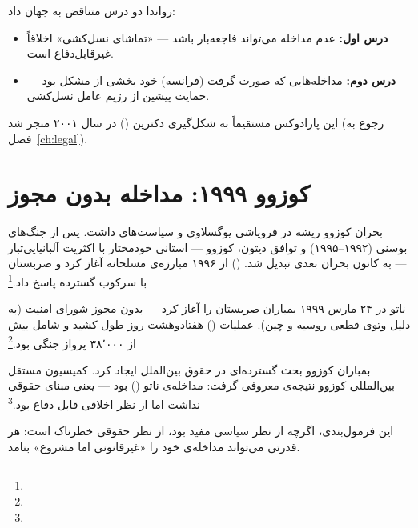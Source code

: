 \begin{tcolorbox}[wavebox, title={درس رواندا: پارادوکس مداخله}]
رواندا دو درس متناقض به جهان داد:
\begin{itemize}
\item \textbf{درس اول:} عدم مداخله می‌تواند فاجعه‌بار باشد — «تماشای نسل‌کشی» اخلاقاً غیرقابل‌دفاع است.
\item \textbf{درس دوم:} مداخله‌هایی که صورت گرفت (فرانسه) خود بخشی از مشکل بود — حمایت پیشین از رژیم عامل نسل‌کشی.
\end{itemize}
این پارادوکس مستقیماً به شکل‌گیری دکترین  () در سال ۲۰۰۱ منجر شد (رجوع به فصل~\ref{ch:legal}).
\end{tcolorbox}

\section{کوزوو ۱۹۹۹: مداخله بدون مجوز}
\label{sec:ch10-kosovo}

بحران کوزوو ریشه در فروپاشی یوگسلاوی و سیاست‌های  داشت. پس از جنگ‌های بوسنی (۱۹۹۲–۱۹۹۵) و توافق دیتون، کوزوو — استانی خودمختار با اکثریت آلبانیایی‌تبار — به کانون بحران بعدی تبدیل شد.  () از ۱۹۹۶ مبارزه‌ی مسلحانه آغاز کرد و صربستان با سرکوب گسترده پاسخ داد.\footnote{}

ناتو در ۲۴ مارس ۱۹۹۹ بمباران صربستان را آغاز کرد — بدون مجوز شورای امنیت (به دلیل وتوی قطعی روسیه و چین). عملیات  () هفتادوهشت روز طول کشید و شامل بیش از ۳۸٬۰۰۰ پرواز جنگی بود.\footnote{}

\begin{tcolorbox}[legalbox, title={نکته‌ی حقوقی: مشروعیت بدون قانونیت؟}]
بمباران کوزوو بحث گسترده‌ای در حقوق بین‌الملل ایجاد کرد. کمیسیون مستقل بین‌المللی کوزوو نتیجه‌ی معروفی گرفت: مداخله‌ی ناتو  () بود — یعنی مبنای حقوقی نداشت اما از نظر اخلاقی قابل دفاع بود.\footnote{}

این فرمول‌بندی، اگرچه از نظر سیاسی مفید بود، از نظر حقوقی خطرناک است: هر قدرتی می‌تواند مداخله‌ی خود را «غیرقانونی اما مشروع» بنامد.
\end{tcolorbox}

